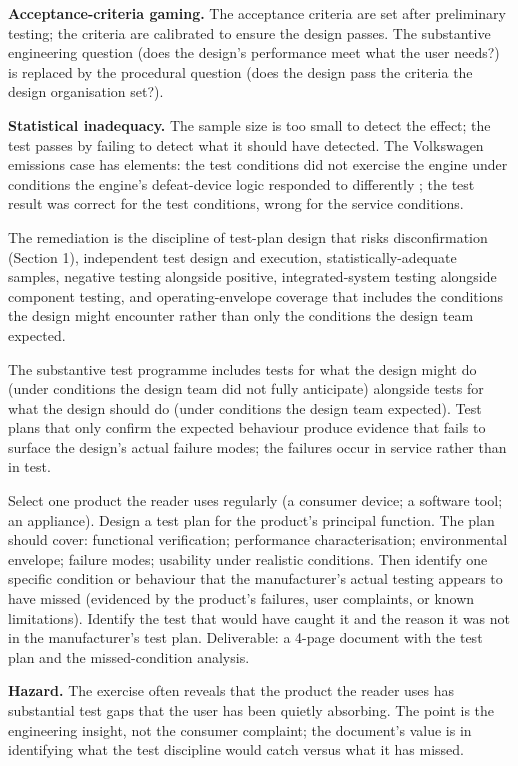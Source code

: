 \textbf{Acceptance-criteria gaming.} The acceptance criteria are set after preliminary testing; the criteria are calibrated to ensure the design passes. The substantive engineering question (does the design's performance meet what the user needs?) is replaced by the procedural question (does the design pass the criteria the design organisation set?).

\textbf{Statistical inadequacy.} The sample size is too small to detect the effect; the test passes by failing to detect what it should have detected. The Volkswagen emissions case has elements: the test conditions did not exercise the engine under conditions the engine's defeat-device logic responded to differently \cite{acc:epa-vw-nov-2015}; the test result was correct for the test conditions, wrong for the service conditions.

The remediation is the discipline of test-plan design that risks disconfirmation (Section 1), independent test design and execution, statistically-adequate samples, negative testing alongside positive, integrated-system testing alongside component testing, and operating-envelope coverage that includes the conditions the design might encounter rather than only the conditions the design team expected.

\begin{principle}
The substantive test programme includes tests for what the design might do (under conditions the design team did not fully anticipate) alongside tests for what the design should do (under conditions the design team expected). Test plans that only confirm the expected behaviour produce evidence that fails to surface the design's actual failure modes; the failures occur in service rather than in test.
\end{principle}

\begin{project}
Select one product the reader uses regularly (a consumer device; a software tool; an appliance). Design a test plan for the product's principal function. The plan should cover: functional verification; performance characterisation; environmental envelope; failure modes; usability under realistic conditions. Then identify one specific condition or behaviour that the manufacturer's actual testing appears to have missed (evidenced by the product's failures, user complaints, or known limitations). Identify the test that would have caught it and the reason it was not in the manufacturer's test plan. Deliverable: a 4-page document with the test plan and the missed-condition analysis.

\textbf{Hazard.} The exercise often reveals that the product the reader uses has substantial test gaps that the user has been quietly absorbing. The point is the engineering insight, not the consumer complaint; the document's value is in identifying what the test discipline would catch versus what it has missed.
\end{project}

